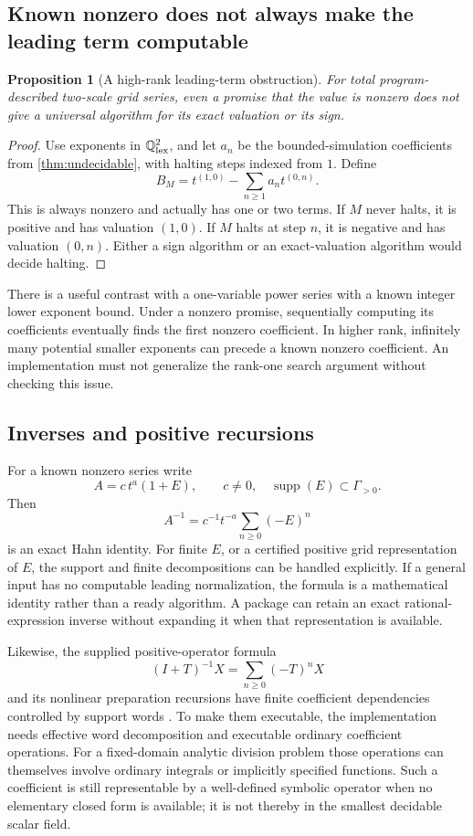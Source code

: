 \documentclass[11pt,letterpaper]{article}
\numberwithin{equation}{section}
\newtheorem{proposition}[theorem]{Proposition}
\theoremstyle{definition}
\theoremstyle{remark}\newtheorem{remark}[theorem]{Remark}
\newcommand{\Q}{\mathbb Q}
\newcommand{\supp}{\operatorname{supp}}
\begin{document}
\subsection{Known nonzero does not always make the leading term computable}
\begin{proposition}[A high-rank leading-term obstruction]
\label{prop:leading}
For total program-described two-scale grid series, even a promise that the
value is nonzero does not give a universal algorithm for its exact valuation
or its sign.
\end{proposition}
\begin{proof}
Use exponents in $\Q^2_{\rm lex}$, and let $a_n$ be the bounded-simulation
coefficients from \cref{thm:undecidable}, with halting steps indexed from $1$.
Define
\[
 B_M=t^{(1,0)}-\sum_{n\ge1}a_nt^{(0,n)}.
\]
This is always nonzero and actually has one or two terms. If $M$ never
halts, it is positive and has valuation $(1,0)$. If $M$ halts at step $n$,
it is negative and has valuation $(0,n)$. Either a sign algorithm or an
exact-valuation algorithm would decide halting.
\end{proof}
There is a useful contrast with a one-variable power series with a known
integer lower exponent bound. Under a nonzero promise, sequentially computing
its coefficients eventually finds the first nonzero coefficient. In higher
rank, infinitely many potential smaller exponents can precede a known nonzero
coefficient. An implementation must not generalize the rank-one search
argument without checking this issue.

\subsection{Inverses and positive recursions}
For a known nonzero series write
\[
 A=c\,t^a(1+E),\qquad c\ne0,\quad \supp(E)\subset\Gamma_{>0}.
\]
Then
\begin{equation}\label{eq:inverse}
 A^{-1}=c^{-1}t^{-a}\sum_{n\ge0}(-E)^n
\end{equation}
is an exact Hahn identity. For finite $E$, or a certified positive grid
representation of $E$, the support and finite decompositions can be handled
explicitly. If a general input has no computable leading normalization, the
formula is a mathematical identity rather than a ready algorithm. A package
can retain an exact rational-expression inverse without expanding it when
that representation is available.

Likewise, the supplied positive-operator formula
\[
 (I+T)^{-1}X=\sum_{n\ge0}(-T)^nX
\]
and its nonlinear preparation recursions have finite coefficient dependencies
controlled by support words \cite{SourceResearch}. To make them executable,
the implementation needs effective word decomposition and executable ordinary
coefficient operations. For a fixed-domain analytic division problem those
operations can themselves involve ordinary integrals or implicitly specified
functions. Such a coefficient is still representable by a well-defined
symbolic operator when no elementary closed form is available; it is not
thereby in the smallest decidable scalar field.
\end{document}
